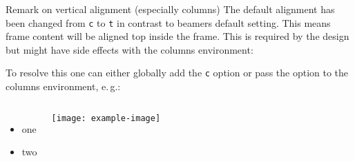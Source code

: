\documentclass[
	english, %
	design=2023, %
	]{tudabeamer}
\newcommand*{\code}[1]{\texttt{#1}}
\begin{document}
\begin{frame}{Remark on vertical alignment (especially columns)}
	The default alignment has been changed from \code{c} to \code{t} in contrast to beamers default setting.
	This means frame content will be aligned top inside the frame.
	This is required by the design but might have side effects with the columns environment:

	To resolve this one can either globally add the \code{c} option or pass the option to the columns environment, e.\,g.:

	\begin{columns}[onlytextwidth,c]
		\begin{itemize}
			\item one
			\item two
		\end{itemize}
		\texttt{[image: example-image]}
	\end{columns}
\end{frame}
\end{document}
